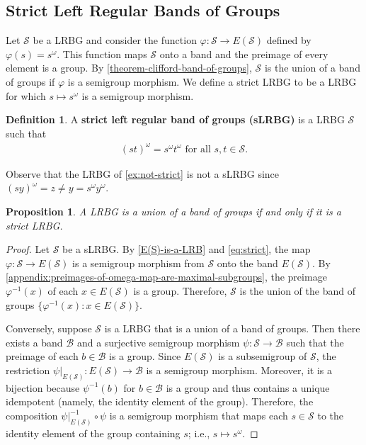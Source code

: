 \documentclass[11pt, oneside, reqno]{amsart}
\newtheorem{prop}[theorem]{Proposition}
\theoremstyle{definition}
\newtheorem{definition}[theorem]{Definition}
\numberwithin{equation}{section}
\newcommand{\defn}[1]{{\color{RoyalBlue}\bf#1}}
\def \BB{{\mathcal{B}}}
\def \SS{{\mathcal{S}}}
\begin{document}
\subsection{Strict Left Regular Bands of Groups}

Let $\SS$ be a LRBG and consider the function $\varphi: \SS \to E(\SS)$ defined
by $\varphi(s) = s^\omega$.
This function maps $\SS$ onto a band and the preimage of every element is a group.
By \cref{theorem-clifford-band-of-groups}, $\SS$ is the union of a band
of groups if $\varphi$ is a semigroup morphism.
We define a strict LRBG to be a LRBG for which $s \mapsto s^\omega$ is a semigroup morphism.

\begin{definition}
    A \defn{strict left regular band of groups (sLRBG)} is a LRBG $\SS$ such that
    \begin{align}
        \label{eq:strict}
        \tag{sLRBG}     (st)^\omega = s^\omega t^\omega
        \text{~for all $s,t \in \SS$.}
    \end{align}
\end{definition}

Observe that the LRBG of \cref{ex:not-strict} is not a sLRBG since
$(s y)^\omega = z \neq y = s^\omega y^\omega$.

\begin{prop}
    \label{strict-iff-BG}
    A LRBG is a union of a band of groups if and only if it is a strict LRBG.
\end{prop}

\begin{proof}
    Let $\SS$ be a sLRBG. By \cref{E(S)-is-a-LRB} and \cref{eq:strict}, the map
    $\varphi: \SS \to E(\SS)$ is a semigroup morphism from $\SS$ onto the band
    $E(\SS)$. By \cref{appendix:preimages-of-omega-map-are-maximal-subgroups},
    the preimage $\varphi^{-1}(x)$ of each $x \in E(\SS)$ is
    a group. Therefore, $\SS$ is the union of the band of groups
    $\{\varphi^{-1}(x) : x \in E(\SS)\}$.

    Conversely, suppose $\SS$ is a LRBG that is a union of a band of groups.
    Then there exists a band $\BB$ and a surjective semigroup morphism $\psi:
    \SS \xrightarrow{} \BB$ such that the preimage of each $b \in \BB$ is
    a group.
    Since $E(\SS)$ is a subsemigroup of $\SS$, the restriction
    $\psi|_{E(\SS)}: E(\SS) \to \BB$ is a semigroup morphism.
    Moreover, it is a bijection because $\psi^{-1}(b)$ for $b \in \BB$ is
    a group and thus contains a unique idempotent (namely, the identity element
    of the group).
    Therefore, the composition
    $\psi|_{E(\SS)}^{-1} \circ \psi$
    is a semigroup morphism that maps each $s \in \SS$ to the identity element
    of the group containing $s$; i.e., $s \mapsto s^\omega$.
\end{proof}
\end{document}
